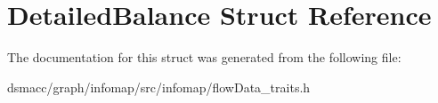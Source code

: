 \hypertarget{structDetailedBalance}{}\section{Detailed\+Balance Struct Reference}
\label{structDetailedBalance}


The documentation for this struct was generated from the following file\+:\begin{DoxyCompactItemize}
\item 
dsmacc/graph/infomap/src/infomap/flow\+Data\+\_\+traits.\+h\end{DoxyCompactItemize}
